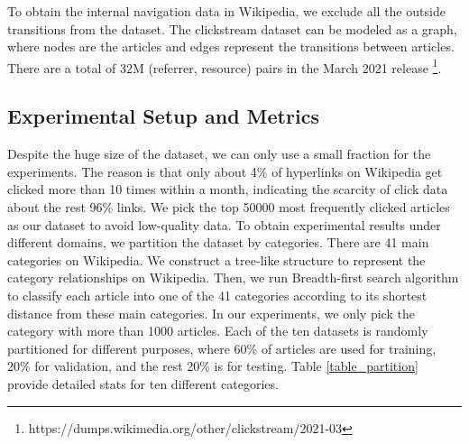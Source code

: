 To obtain the internal navigation data in Wikipedia, we exclude all the outside transitions from the dataset. The clickstream dataset can be modeled as a graph, where nodes are the articles and edges represent the transitions between articles. There are a total of 32M (referrer, resource) pairs in the March 2021 release \footnote{https://dumps.wikimedia.org/other/clickstream/2021-03}.

\subsection{Experimental Setup and Metrics}

Despite the huge size of the dataset, we can only use a small fraction for the experiments. The reason is that only about 4\% of hyperlinks on Wikipedia get clicked more than 10 times within a month, indicating the scarcity of click data about the rest 96\% links. We pick the top 50000 most frequently clicked articles as our dataset to avoid low-quality data. To obtain experimental results under different domains, we partition the dataset by categories. There are 41 main categories on Wikipedia. We construct a tree-like structure to represent the category relationships on Wikipedia. Then, we run Breadth-first search algorithm to classify each article into one of the 41 categories according to its shortest distance from these main categories. In our experiments, we only pick the category with more than 1000 articles. Each of the ten datasets is randomly partitioned for different purposes, where 60\% of articles are used for training, 20\% for validation, and the rest 20\% is for testing. Table \ref{table_partition} provide detailed stats for ten different categories.

